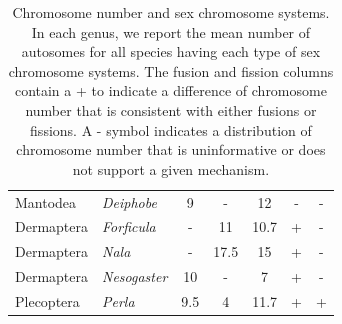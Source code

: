 \documentclass[]{rsos}%
\begin{document}
\begin{table}[h!]
\begin{tabular}{llccccc}
Mantodea    & \textit{Deiphobe}        & 9    & -    & 12    & -      & - \\
Dermaptera  & \textit{Forficula}       & -    & 11   & 10.7  & +      & - \\
Dermaptera  & \textit{Nala}            & -    & 17.5 & 15    & +      & - \\
Dermaptera  & \textit{Nesogaster}      & 10   & -    & 7     & +      & - \\
Plecoptera  & \textit{Perla}           & 9.5  & 4    & 11.7  & +      & + \\ \hline
\end{tabular}
\caption{Chromosome number and sex chromosome systems. In each genus, we report the mean number of autosomes for all species having each type of sex chromosome systems. The fusion and fission columns contain a + to indicate a difference of chromosome number that is consistent with either fusions or fissions. A - symbol indicates a distribution of chromosome number that is uninformative or does not support a given mechanism.}
\label{tab:fusions}
\end{table}





\vspace*{-10pt}

\noindent 

\end{document}
